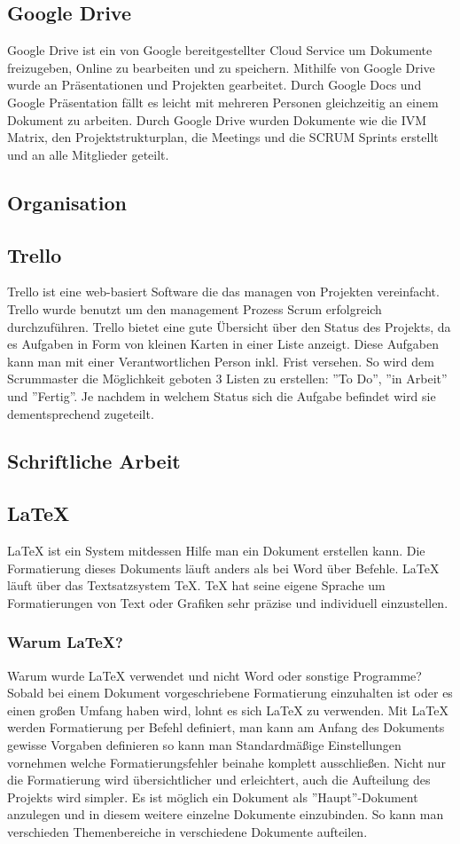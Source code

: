 \subsection {Google Drive}
\label{sec:GoogleDrive}
Google Drive ist ein von Google bereitgestellter Cloud Service um Dokumente freizugeben, Online zu bearbeiten und zu speichern.
Mithilfe von Google Drive wurde an Präsentationen und Projekten gearbeitet. Durch Google Docs und Google Präsentation fällt es leicht mit mehreren Personen gleichzeitig an einem Dokument zu arbeiten. Durch Google Drive wurden Dokumente wie die IVM Matrix, den Projektstrukturplan, die Meetings und die SCRUM Sprints erstellt und an alle Mitglieder geteilt. 
\subsection{Organisation}
\label{sec:Organisation}
\subsection {Trello}
\label{sec:Trello}
Trello ist eine web-basiert Software die das managen von Projekten vereinfacht. Trello wurde benutzt um den management Prozess Scrum erfolgreich durchzuführen. Trello bietet eine gute Übersicht über den Status des Projekts, da es Aufgaben in Form von kleinen Karten in einer Liste anzeigt. Diese Aufgaben kann man mit einer Verantwortlichen Person inkl. Frist versehen. So wird dem Scrummaster die Möglichkeit geboten 3 Listen zu erstellen: ''To Do'', ''in Arbeit'' und ''Fertig''. Je nachdem in welchem Status sich die Aufgabe befindet wird sie dementsprechend zugeteilt.
\subsection{Schriftliche Arbeit}
\label{sec:TechSchriftlicheArbeit}
\subsection {LaTeX}
\label{sec:LaTeX}
LaTeX ist ein System mitdessen Hilfe man ein Dokument erstellen kann. Die Formatierung dieses Dokuments läuft anders als bei Word über Befehle. LaTeX läuft über das Textsatzsystem TeX. TeX hat seine eigene Sprache um Formatierungen von Text oder Grafiken sehr präzise und individuell einzustellen. 
\subsubsection{Warum LaTeX?}
\label{sec:WarumLaTeX} 
Warum wurde LaTeX verwendet und nicht Word oder sonstige Programme? Sobald bei einem Dokument vorgeschriebene Formatierung einzuhalten ist oder es einen großen Umfang haben wird, lohnt es sich LaTeX zu verwenden. Mit LaTeX werden Formatierung per Befehl definiert, man kann am Anfang des Dokuments gewisse Vorgaben definieren so kann man Standardmäßige Einstellungen vornehmen welche Formatierungsfehler beinahe komplett ausschließen. Nicht nur die Formatierung wird übersichtlicher und erleichtert, auch die Aufteilung des Projekts wird simpler. Es ist möglich ein Dokument als ''Haupt''-Dokument anzulegen und in diesem weitere einzelne Dokumente einzubinden. So kann man verschieden Themenbereiche in verschiedene Dokumente aufteilen. \cite{TechnologieLaTeX} 